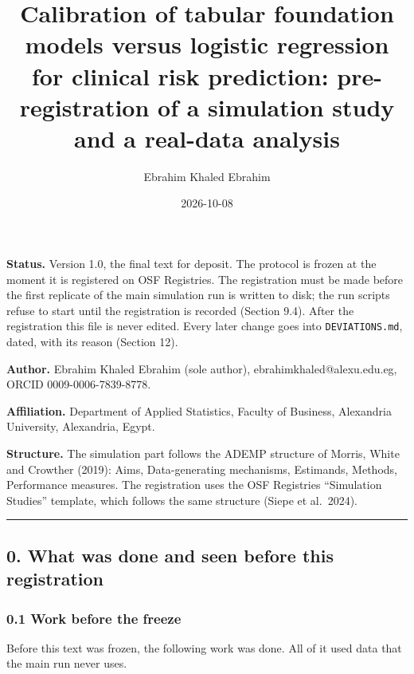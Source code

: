 \documentclass[
  10pt,
]{article}
\title{Calibration of tabular foundation models versus
logistic regression for clinical risk prediction:
pre-registration of a simulation study and a real-data
analysis}
\author{Ebrahim Khaled Ebrahim}
\date{2026-10-08}
\begin{document}
\maketitle

\textbf{Status.} Version 1.0, the final text for deposit.
The protocol is frozen at the moment it is registered on OSF
Registries. The registration must be made before the first
replicate of the main simulation run is written to disk; the
run scripts refuse to start until the registration is
recorded (Section 9.4). After the registration this file is
never edited. Every later change goes into
\texttt{DEVIATIONS.md}, dated, with its reason (Section 12).

\textbf{Author.} Ebrahim Khaled Ebrahim (sole author),
ebrahimkhaled@alexu.edu.eg, ORCID 0009-0006-7839-8778.

\textbf{Affiliation.} Department of Applied Statistics,
Faculty of Business, Alexandria University, Alexandria,
Egypt.

\textbf{Structure.} The simulation part follows the ADEMP
structure of Morris, White and Crowther (2019): Aims,
Data-generating mechanisms, Estimands, Methods, Performance
measures. The registration uses the OSF Registries
``Simulation Studies'' template, which follows the same
structure (Siepe et al.~2024).

\begin{center}\rule{0.5\linewidth}{0.5pt}\end{center}

\subsection{0. What was done and seen before this
registration}\label{what-was-done-and-seen-before-this-registration}

\subsubsection{0.1 Work before the
freeze}\label{work-before-the-freeze}

Before this text was frozen, the following work was done.
All of it used data that the main run never uses.
\end{document}
